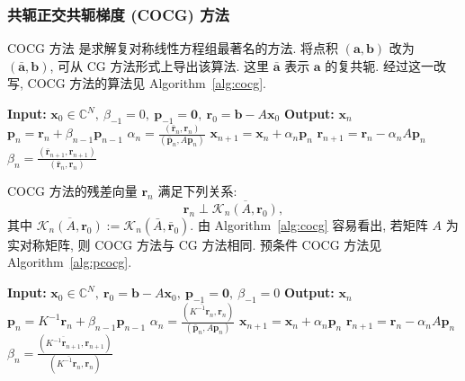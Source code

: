 \subsubsection{{共轭正交共轭梯度 (COCG) 方法}}\label{subsec:cocg-method}\label{srcpage:printed-91}
{COCG 方法  是求解复对称线性方程组最著名的方法. 将点积 $(\bm a,\bm b)$ 改为 $(\bar{\bm a},\bm b)$, 可从 CG 方法形式上导出该算法. 这里 $\bar{\bm a}$ 表示 $\bm a$ 的复共轭. 经过这一改写, COCG 方法的算法见 Algorithm\ \ref{alg:cocg}.}
\begin{algorithm}[H]\caption{{COCG 方法 (注意: $(\bar{\bm a},\bm b)=\bm a^{\top}\bm b$)}}\label{alg:cocg}\begin{algorithmic}[1]
\Statex\textbf{Input:} $\bm x_0\in\mathbb C^N,\ \beta_{-1}=0,\ \bm p_{-1}=\bm0,\ \bm r_0=\bm b-A\bm x_0$
\Statex\textbf{Output:} $\bm x_n$
\State $\bm p_n=\bm r_n+\beta_{n-1}\bm p_{n-1}$
\State $\alpha_n=\frac{(\bar{\bm r}_n,\bm r_n)}{(\bar{\bm p}_n,A\bm p_n)}$
\State $\bm x_{n+1}=\bm x_n+\alpha_n\bm p_n$
\State $\bm r_{n+1}=\bm r_n-\alpha_nA\bm p_n$
\State $\beta_n=\frac{(\bar{\bm r}_{n+1},\bm r_{n+1})}{(\bar{\bm r}_n,\bm r_n)}$
\EndFor\end{algorithmic}\end{algorithm}
{COCG 方法的残差向量 $\bm r_n$ 满足下列关系:}
\[\bm r_n\perp\overline{\mathcal K_n(A,\bm r_0)},\]
{其中 $\overline{\mathcal K_n(A,\bm r_0)}:=\mathcal K_n(\bar A,\bar{\bm r}_0)$. 由 Algorithm\ \ref{alg:cocg} 容易看出, 若矩阵 $A$ 为实对称矩阵, 则 COCG 方法与 CG 方法相同. 预条件 COCG 方法见 Algorithm\ \ref{alg:pcocg}.}
\begin{algorithm}[H]\caption{{预条件 COCG 方法 (注意: $(\bar{\bm a},\bm b)=\bm a^{\top}\bm b$)}}\label{alg:pcocg}\label{srcpage:printed-92}\begin{algorithmic}[1]
\Statex\textbf{Input:} $\bm x_0\in\mathbb C^N,\ \bm r_0=\bm b-A\bm x_0,\ \bm p_{-1}=\bm0,\ \beta_{-1}=0$
\Statex\textbf{Output:} $\bm x_n$
\State $\bm p_n=K^{-1}\bm r_n+\beta_{n-1}\bm p_{n-1}$
\State $\alpha_n=\frac{(\overline{K^{-1}\bm r_n},\bm r_n)}{(\bar{\bm p}_n,A\bm p_n)}$
\State $\bm x_{n+1}=\bm x_n+\alpha_n\bm p_n$
\State $\bm r_{n+1}=\bm r_n-\alpha_nA\bm p_n$
\State $\beta_n=\frac{(\overline{K^{-1}\bm r_{n+1}},\bm r_{n+1})}{(\overline{K^{-1}\bm r_n},\bm r_n)}$
\EndFor\end{algorithmic}\end{algorithm}
